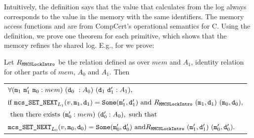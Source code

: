 Intuitively, the definition says that the value that
 calculates from the log always corresponds to the value 
in the memory with the same identifiers. The memory access functions  and  are
from CompCert's operational semantics for C.
Using the definition, we prove one theorem for each primitive, which
shows that the memory refines the shared log. E.g., for  we prove:

\begin{theorem}
    \label{thm:chapter:mcslock:machine-state-refinement} Let $R_{{\mathrm{\texttt{MMCSLockIntro}}}}$ be the relation defined as 
    over $mem$ and $A_1$, 
identity relation for other parts of $mem$, $A_0$ and $A_1$. Then\newline
 \begin{tabular}{P{0.95\textwidth}}
$ \forall (\codeinmath{{m}}_{1} \ \codeinmath{{m}}_{1}'\ \codeinmath{{m}}_{0} : mem)\  (\codeinmath{{d}}_{0} \ : A_0)\ (\codeinmath{{d}}_{1} \ \codeinmath{{d}}_{1}' : A_1),$ \\
$ \mbox{if } {\mathrm{\texttt{{mcs\_SET\_NEXT}}}}_{L_1}(v, {\mathrm{\texttt{{m}}}}_1, {\mathrm{\texttt{{d}}}}_1) = {\mathrm{\texttt{{Some}}}}({\mathrm{\texttt{{m}}}}'_1, {\mathrm{\texttt{{d}}}}'_1) \mbox{ and }
  R_{{\mathrm{\texttt{MMCSLockIntro}}}}\ ({\mathrm{\texttt{{m}}}}_1, {\mathrm{\texttt{{d}}}}_1)\ ({\mathrm{\texttt{{m}}}}_0, {\mathrm{\texttt{{d}}}}_0),$\\
  $ \mbox{ then there exists } ({\mathrm{\texttt{{m}}}}_{0}' : mem)\ ({\mathrm{\texttt{{d}}}}_{0}' : A_0), \mbox{ such that}$\\
$  {\mathrm{\texttt{{mcs\_SET\_NEXT}}}}_{L_0}(v, {\mathrm{\texttt{{m}}}}_0, {\mathrm{\texttt{{d}}}}_0) = {\mathrm{\texttt{{Some}}}}({\mathrm{\texttt{{m}}}}'_0, {\mathrm{\texttt{{d}}}}'_0) \mbox{ and}
  R_{{\mathrm{\texttt{MMCSLockIntro}}}}\ ({\mathrm{\texttt{{m}}}}'_1, {\mathrm{\texttt{{d}}}}'_1)\ ({\mathrm{\texttt{{m}}}}'_0, {\mathrm{\texttt{{d}}}}'_0).$ 
   \end{tabular}
\end{theorem}


